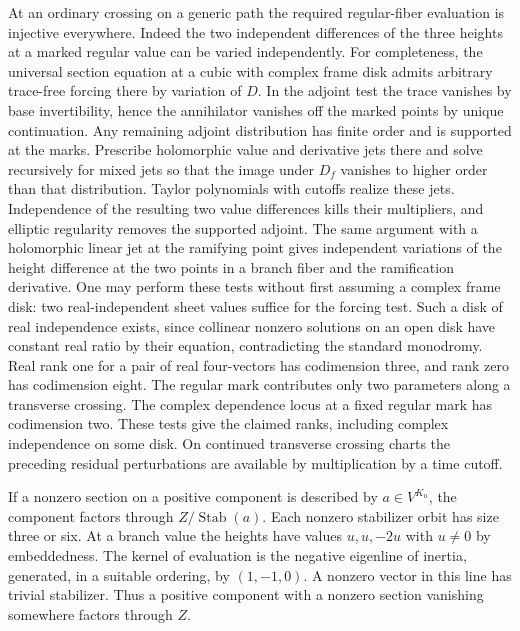 At an ordinary crossing on a generic path the required regular-fiber
evaluation is injective everywhere. Indeed the two independent
differences of the three heights at a marked regular value can be
varied independently. For completeness, the universal section
equation at a cubic with complex frame disk admits arbitrary trace-free
forcing there by variation of $D$. In the adjoint test the trace
vanishes by base invertibility, hence the annihilator vanishes off
the marked points by unique continuation. Any remaining adjoint
distribution has finite order and is supported at the marks. Prescribe
holomorphic value and derivative jets there and solve recursively
for mixed jets so that the image under $D_f$ vanishes to higher
order than that distribution. Taylor polynomials with cutoffs realize
these jets. Independence of the resulting two value differences
kills their multipliers, and elliptic regularity removes the supported
adjoint. The same argument with a holomorphic
linear jet at the ramifying point gives independent variations of the
height difference at the two points in a branch fiber and the
ramification derivative. One may perform these tests without first
assuming a complex frame disk: two real-independent sheet values
suffice for the forcing test. Such a disk of real independence exists,
since collinear nonzero solutions on an open disk have constant real
ratio by their equation, contradicting the standard monodromy.
Real rank one for a pair of real four-vectors has codimension three,
and rank zero has codimension eight. The regular mark contributes
only two parameters along a transverse crossing. The complex
dependence locus at a fixed regular mark has codimension two.
These tests give the claimed ranks, including complex independence
on some disk. On continued transverse crossing charts the preceding
residual perturbations are available by multiplication by a time
cutoff.

If a nonzero section on a positive component is described by
$a\in V^{K_u}$, the component factors through
$Z/\operatorname{Stab}(a)$. Each nonzero stabilizer orbit has size
three or six. At a branch value the heights have values $u,u,-2u$
with $u\ne0$ by embeddedness. The kernel of evaluation is the
negative eigenline of inertia, generated, in a suitable ordering, by
$(1,-1,0)$. A nonzero vector in this line has trivial stabilizer.
Thus a positive component with a nonzero section vanishing somewhere
factors through $Z$.


